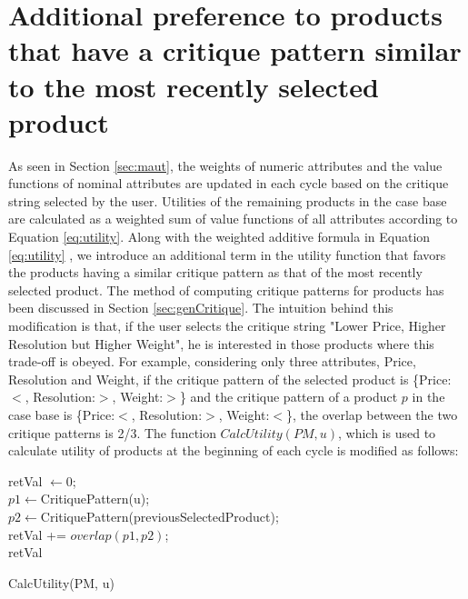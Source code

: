 \section{Additional preference to products that have a critique pattern similar to the most recently selected product}
\label{sec:addTerm}
As seen in Section \ref{sec:maut}, the weights of numeric attributes and the value functions of nominal attributes are updated in each cycle based on the critique string selected by the user.
Utilities of the remaining products in the case base are calculated as a weighted sum of value functions of all attributes according to Equation \ref{eq:utility}.
Along with the weighted additive formula in Equation \ref{eq:utility} , we introduce an additional term in the utility function that favors the products having a similar critique pattern as that of the most recently selected product.
The method of computing critique patterns for products has been discussed in Section \ref{sec:genCritique}.
The intuition behind this modification is that, if the user selects the critique string "Lower Price, Higher Resolution but Higher Weight", he is interested in those products where this trade-off is obeyed.
For example, considering only three attributes, Price, Resolution and Weight, if the critique pattern of the selected product is \{Price:$<$, Resolution:$>$, Weight:$>$\} and the critique pattern of a product $p$ in the case base is \{Price:$<$, Resolution:$>$, Weight:$<$\}, the overlap between the two critique patterns is 2/3.
The function $CalcUtility(PM, u)$, which is used to calculate utility of products at the beginning of each cycle is modified as follows:

\begin{algorithm}[ht]
  \DontPrintSemicolon

  retVal $\gets 0$;\\
  $p1 \gets $CritiquePattern(u);\\
  $p2 \gets $CritiquePattern(previousSelectedProduct);\\
  retVal += $overlap(p1, p2)$;\\
  \Return retVal
  \caption{CalcUtility(PM, u)}
  \label{algo:addPref}
\end{algorithm}



